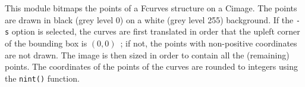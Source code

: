 This module bitmaps the points of a Fcurves structure on a Cimage.
The points are drawn in black
(grey level 0) on a white (grey level 255) background. 
If the \verb+-s+ option is selected, the curves are 
first translated in order that the upleft corner of the bounding box
is  $(0,0)$~; if not, the points with non-positive 
coordinates are not drawn.
The image is then sized in order to contain all the (remaining) points.
The coordinates of the points of the curves are
rounded to integers using the \verb+nint()+ function. 

